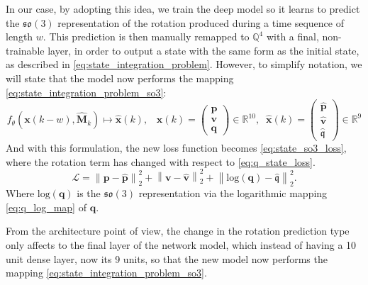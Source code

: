 In our case, by adopting this idea, we train the deep model so it learns to predict the $\mathfrak{so}(3)$ representation of the rotation produced during a time sequence of length $w$.
This prediction is then manually remapped to $\mathbb{Q}^4$ with a final, non-trainable layer, in order to output a state with the same form as the initial state, as described in \ref{eq:state_integration_problem}. 
However, to simplify notation, we will state that the model now performs the mapping \ref{eq:state_integration_problem_so3}:
\begin{equation}\label{eq:state_integration_problem_so3}
    f_\theta\left(\mathbf{x}(k-w),\mathbf{\hat{M}}_k\right)\mapsto\mathbf{\hat{x}}(k), \;\;\;
    \mathbf{x}(k)=\begin{pmatrix}\mathbf{p}\\ \mathbf{v}\\ \mathbf{q}\end{pmatrix}\in \mathbb{R}^{10},\;\;
    \mathbf{\hat{x}}(k)=\begin{pmatrix}\mathbf{\hat{p}}\\ \mathbf{\hat{v}}\\ \mathfrak{\hat{q}}\end{pmatrix}\in \mathbb{R}^{9}
\end{equation}
And with this formulation, the new loss function becomes \ref{eq:state_so3_loss}, where the rotation term has changed with respect to \ref{eq:q_state_loss}.
\begin{equation}\label{eq:state_so3_loss}
    \mathcal{L}= \left \|\mathbf{p}-\mathbf{\hat{p}}  \right \|_2^2 + \left\|\mathbf{v}-\mathbf{\hat{v}}  \right \|_2^2 + \left\|\textrm{log}\left(\mathbf{q}\right)-\mathfrak{\hat{q}}\right\|_2^2.
\end{equation}
Where $\textrm{log}(\mathbf{q})$ is the $\mathfrak{so}(3)$ representation via the logarithmic mapping \ref{eq:q_log_map} of $\mathbf{q}$.

From the architecture point of view, the change in the rotation prediction type only affects to the final layer of the network model, which instead of having a 10 unit dense layer, now its 9 units, so that the new model now performs the mapping \ref{eq:state_integration_problem_so3}.

